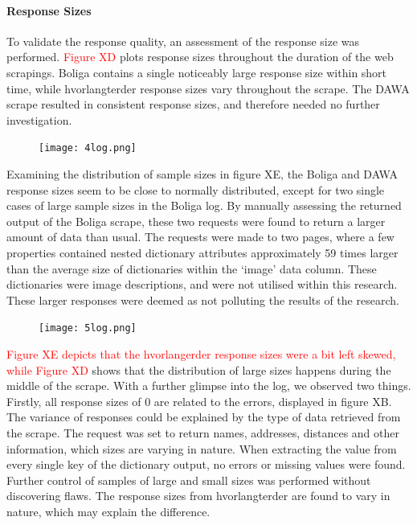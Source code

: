 \documentclass[12pt,a4paper]{article}
\begin{document}
\paragraph{Response Sizes\newline}
To validate the response quality, an assessment of the response size was performed. \textcolor{red}{Figure XD} plots response sizes throughout the duration of the web scrapings. Boliga contains a single noticeably large response size within short time, while hvorlangterder response sizes vary throughout the scrape. The DAWA scrape resulted in consistent response sizes, and therefore needed no further investigation. 
\begin{figure}[H]
  \centering
   \caption{}
   \texttt{[image: 4log.png]} 
  \label{fig:}
\end{figure}
Examining the distribution of sample sizes in figure XE, the Boliga and DAWA response sizes seem to be close to normally distributed, except for two single cases of large sample sizes in the Boliga log. By manually assessing the returned output of the Boliga scrape, these two requests were found to return a larger amount of data than usual. The requests were made to two pages, where a few properties contained nested dictionary attributes approximately 59 times larger than the average size of dictionaries within the ‘image’ data column. These dictionaries were image descriptions, and were not utilised within this research. These larger responses were deemed as not polluting the results of the research.
\begin{figure}[H]
  \centering
   \caption{}
   \texttt{[image: 5log.png]} 
  \label{fig:}
\end{figure}
\textcolor{red}{Figure XE depicts that the hvorlangerder response sizes were a bit left skewed, while Figure XD} shows that the distribution of large sizes happens during the middle of the scrape. With a further glimpse into the log, we observed two things. Firstly, all response sizes of 0 are related to the errors, displayed in figure XB. The variance of responses could be explained by the type of data retrieved from the scrape. The request was set to return names, addresses, distances and other information, which sizes are varying in nature. When extracting the value from every single key of the dictionary output, no errors or missing values were found. Further control of samples of large and small sizes was performed without discovering flaws. The response sizes from hvorlangterder are found to vary in nature, which may explain the difference.  
\end{document}
